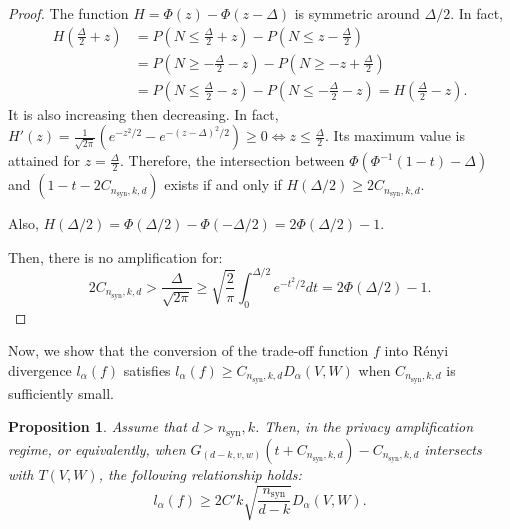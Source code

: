 \documentclass{article}
\theoremstyle{plain}
\newtheorem{proposition}{Proposition}[section]
\theoremstyle{definition}
\theoremstyle{remark}
\begin{document}
\begin{proof}
The function $H = \Phi(z) - \Phi(z-\Delta)$ is symmetric around $\Delta/2$. In fact,
\begin{align*}
    H\left(\frac{\Delta}{2} + z\right) &= P\left(N \leq \frac{\Delta}{2} + z\right) - P\left(N \leq z - \frac{\Delta}{2} \right)\\
     &= P\left(N \geq -\frac{\Delta}{2} - z\right) - P\left(N \geq - z + \frac{\Delta}{2} \right)\\
     &=  P\left(N \leq \frac{\Delta}{2} - z \right) - P\left(N \leq -\frac{\Delta}{2} - z\right)= H\left(\frac{\Delta}{2} - z\right).
\end{align*}
It is also increasing then decreasing. In fact, $H'(z) = \frac{1}{\sqrt{2\pi}}(e^{-z^2/2} - e^{-(z-\Delta)^2/2}) \geq 0 \iff z \leq \frac{\Delta}{2}$.
Its maximum value is attained for $z = \frac{\Delta}{2}$. Therefore, the intersection between $\Phi(\Phi^{-1}(1-t) - \Delta)$ and $ (1-t - 2C_{n_{\text{syn}},k,d})$ exists if and only if $H(\Delta/2) \geq 2C_{n_{\text{syn}},k,d}$.

Also, $H(\Delta/2) = \Phi(\Delta/2) - \Phi(-\Delta/2) = 2\Phi(\Delta/2)-1$.

Then, there is no amplification for:
\[2C_{n_{\text{syn}},k,d} > \frac{\Delta}{\sqrt{2\pi}} \geq \sqrt{\frac{2}{\pi}}\int_0^{\Delta/2} e^{-t^2/2} dt = 2\Phi(\Delta/2) -1.\]
\end{proof}

Now, we show that the conversion of the trade-off function $f$ into Rényi divergence $l_\alpha(f)$ satisfies $l_\alpha(f) \geq C_{n_{\text{syn}},k,d} D_\alpha(V,W)$ when $C_{n_{\text{syn}},k,d}$ is sufficiently small.


\begin{proposition}
\label{prop:prior-rate}
    Assume that $d > n_{\text{syn}}, k$. Then, in the privacy amplification regime, or equivalently, when $G_{(d-k,v,w)}\left(t + C_{n_{\text{syn}},k,d}\right) -C_{n_{\text{syn}},k,d}$ intersects with $T(V,W)$, the following relationship holds:
    \[l_\alpha(f) \geq 2C'k\sqrt{\frac{n_{\text{syn}}}{d-k}}D_\alpha(V,W).\]
\end{proposition}
\end{document}
